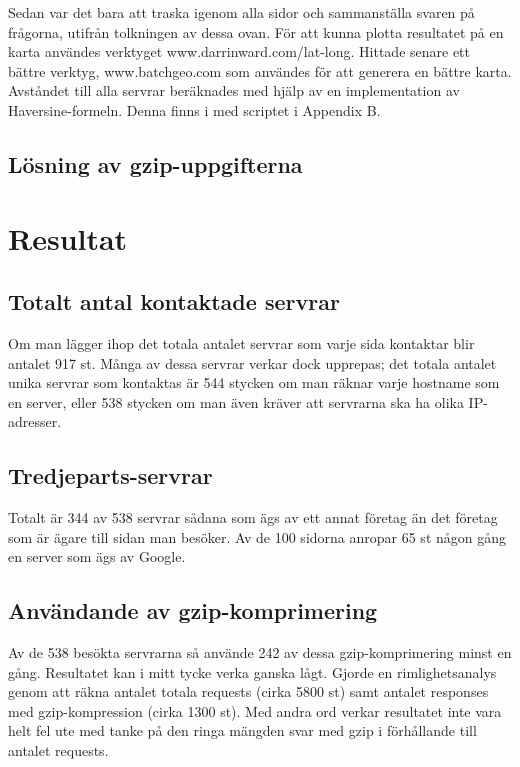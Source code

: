 \documentclass[a4paper]{article}
\begin{document}
Sedan var det bara att traska igenom alla sidor och sammanställa svaren på frågorna, utifrån tolkningen av dessa ovan. För att kunna plotta resultatet på en karta användes verktyget www.darrinward.com/lat-long. Hittade senare ett bättre verktyg, www.batchgeo.com som användes för att generera en bättre karta.\\

Avståndet till alla servrar beräknades med hjälp av en implementation av Haversine-formeln. Denna finns i med scriptet i Appendix B.


\subsection{Lösning av gzip-uppgifterna}


\section{Resultat}
\subsection{Totalt antal kontaktade servrar}
Om man lägger ihop det totala antalet servrar som varje sida kontaktar blir antalet 917 st. Många av dessa servrar verkar dock upprepas; det totala antalet unika servrar som kontaktas är 544 stycken om man räknar varje hostname som en server, eller 538 stycken om man även kräver att servrarna ska ha olika IP-adresser.\\

\subsection{Tredjeparts-servrar}
Totalt är 344 av 538 servrar sådana som ägs av ett annat företag än det företag som är ägare till sidan man besöker. Av de 100 sidorna anropar 65 st någon gång en server som ägs av Google.

\subsection{Användande av gzip-komprimering}
Av de 538 besökta servrarna så använde 242 av dessa gzip-komprimering minst en gång. Resultatet kan i mitt tycke verka ganska lågt. Gjorde en rimlighetsanalys genom att räkna antalet totala requests (cirka 5800 st) samt antalet responses med gzip-kompression (cirka 1300 st). Med andra ord verkar resultatet inte vara helt fel ute med tanke på den ringa mängden svar med gzip i förhållande till antalet requests.\\
\end{document}
